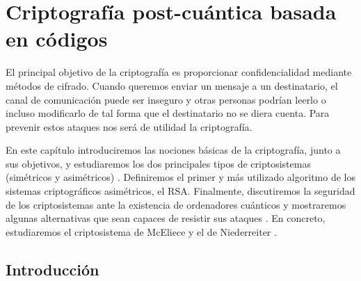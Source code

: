 

\chapter{Criptografía post-cuántica basada en códigos}

El principal objetivo de la criptografía es proporcionar confidencialidad mediante métodos de cifrado. Cuando queremos enviar un mensaje a un destinatario, el canal de comunicación puede ser inseguro y otras personas podrían leerlo o incluso modificarlo de tal forma que el destinatario no se diera cuenta. Para prevenir estos ataques nos será de utilidad la criptografía.

En este capítulo introduciremos las nociones básicas de la criptografía, junto a sus objetivos, y estudiaremos los dos principales tipos de criptosistemas (simétricos y asimétricos) \cite{Introduction_to_cryptography}. Definiremos el primer y más utilizado algoritmo de los sistemas criptográficos asimétricos, el RSA. Finalmente, discutiremos la seguridad de los criptosistemas ante la existencia de ordenadores cuánticos y mostraremos algunas alternativas que sean capaces de resistir sus ataques \cite{Post-Quantum_Cryptography_2009}. En concreto, estudiaremos el criptosistema de McEliece y el de Niederreiter \cite{Sander}.

\section{Introducción}

